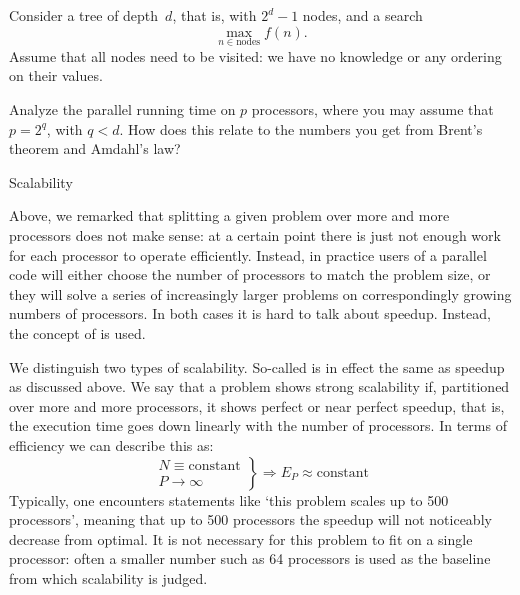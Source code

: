\begin{exercise}
  \label{ex:brent-tree}
  Consider a tree of depth~$d$, that is, with $2^d-1$ nodes,
  and a search \[ \max_{n\in\mathrm{nodes}} f(n). \]
  Assume that all nodes need to be visited: we have no knowledge
  or any ordering on their values.

  Analyze the parallel running time on $p$ processors, where
  you may assume that $p=2^q$, with $q<d$.
  How does this relate to the numbers you get from
  Brent's theorem and Amdahl's law?
\end{exercise}

 {Scalability}
\label{sec:scaling}

Above, we remarked that splitting a given problem over more and more
processors does not make sense: at a certain point there is just not
enough work for each processor to operate efficiently.
Instead, in practice users of a parallel code will either choose the number of
processors to match the problem size, or they will solve a series of
increasingly larger problems on correspondingly growing numbers of
processors. In both cases it is hard to talk about speedup. Instead,
the concept of  is used.

We distinguish two types of scalability.
So-called
is in effect the same as speedup
as discussed above.
We say that a problem shows strong scalability if,
partitioned over more and more processors, it shows perfect or near
perfect speedup, that is, the execution time goes down linearly with
the number of processors. In terms of efficiency we can describe this
as:
\[ \left.
\begin{array}{l}
  N\equiv\mathrm{constant}\\ P\rightarrow\infty
\end{array}
\right\} \Rightarrow E_P\approx\mathrm{constant}
\]
Typically, one encounters statements like `this
problem scales up to 500 processors', meaning that up to 500
processors the speedup will not noticeably decrease from optimal. It
is not necessary for this problem to fit on a single processor: often
a smaller number such as 64 processors is used as the baseline from
which scalability is judged.

